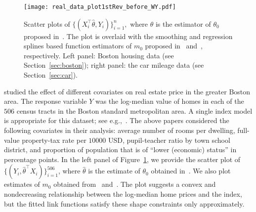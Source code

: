 \begin{figure}[ht!]
\centering
\texttt{[image: real\_data\_plot1stRev\_before\_WY.pdf]}
  \caption[]{Scatter plots of $\{(X_i^\top\hat{\theta}, Y_i)\}_{i=1}^n,$ where $\hat{\theta}$ is the estimator of $\theta_0$ proposed in~\cite{MR2529970}. The plot is overlaid with the smoothing and regression splines based  function estimators of $m_0$ proposed in~\cite{Patra16} and~\cite{MR2529970}, respectively. Left panel: Boston housing data (see Section~\ref{sec:boston}); right panel: the car mileage data (see Section~\ref{sec:car}).}
  \label{fig:real_data_plot_prelim}
\end{figure}

\begin{example}\label{ex:boston}
\citet{harrison1978hedonic} studied the effect of different covariates on real estate price in the greater Boston area.  The response variable $Y$ was the log-median value of homes in each of the $506$ census tracts in the Boston standard metropolitan area. A single index model is  appropriate for this dataset; see e.g.,~\cite{gu2015oracally,MR2529970,MR2589322,MR2787613}. The above papers considered the following covariates in their analysis: average number of rooms per dwelling, full-value property-tax rate per $10000$ USD, pupil-teacher ratio by town school district, and proportion of population that is of ``lower (economic) status'' in percentage points. In the left panel of Figure~\ref{fig:real_data_plot_prelim}, we provide the scatter plot of  $\{(Y_i, \hat{\theta}^\top X_i)\}_{i=1}^{506}$, where $\hat{\theta}$ is the estimate of $\theta_0$ obtained in~\cite{MR2529970}. We also plot estimates of $m_0$ obtained from~\cite{Patra16} and~\cite{MR2529970}. The plot suggests a convex and nondecreasing relationship between the log-median home prices and the index, but the fitted link functions satisfy these shape constraints only approximately. 

  
\end{example}

